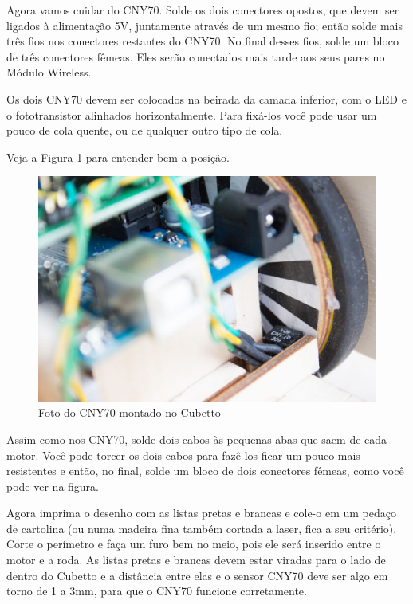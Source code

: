 \documentclass[paper=a4, fontsize=11pt]{scrartcl} %
\numberwithin{equation}{section} %
\numberwithin{figure}{section} %
\numberwithin{table}{section} %
\begin{document}
Agora vamos cuidar do CNY70. Solde os dois conectores opostos, que devem ser ligados à alimentação 5V, juntamente através de um mesmo fio; então solde mais três fios nos conectores restantes do CNY70. No final desses fios, solde um bloco de três conectores fêmeas. Eles serão conectados mais tarde aos seus pares no Módulo Wireless.

Os dois CNY70 devem ser colocados na beirada da camada inferior, com o LED e o fototransistor alinhados horizontalmente. Para fixá-los você pode usar um pouco de cola quente, ou de qualquer outro tipo de cola.

Veja a Figura \ref{fig:cny70 no cubetto} para entender bem a posição.


\begin{figure}[h] %
  \centering
  \includegraphics[scale=0.10]{./imagens/diy-docs-11.jpg}
  \caption[ ]{Foto do CNY70 montado no Cubetto }
  \label{fig:cny70 no cubetto}
\end{figure}

Assim como nos CNY70, solde dois cabos às pequenas abas que saem de cada motor. Você pode torcer os dois cabos para fazê-los ficar um pouco mais resistentes e então, no final, solde um bloco de dois conectores fêmeas, como você pode ver na figura.

Agora imprima o desenho com as listas pretas e brancas e cole-o em um pedaço de cartolina (ou numa madeira fina também cortada a laser, fica a seu critério). Corte o perímetro e faça um furo bem no meio, pois ele será inserido entre o motor e a roda. As listas pretas e brancas devem estar viradas para o lado de dentro do Cubetto e a distância entre elas e o sensor CNY70 deve ser algo em torno de 1 a 3mm, para que o CNY70 funcione corretamente.
\end{document}
